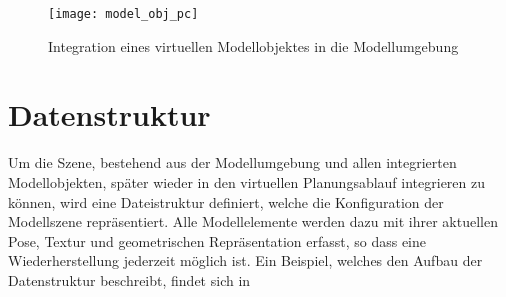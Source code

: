 \begin{figure}[ht]
	\begin{center}
	\texttt{[image: model\_obj\_pc]}
	\caption{Integration eines virtuellen Modellobjektes in die Modellumgebung}
	\label{fig.modobj}
	\end{center}
\end{figure}



\section{Datenstruktur}
Um die Szene, bestehend aus der Modellumgebung und allen integrierten Modellobjekten, später wieder in den virtuellen Planungsablauf integrieren zu können, wird eine Dateistruktur definiert, welche die Konfiguration der Modellszene repräsentiert. Alle Modellelemente werden dazu mit ihrer aktuellen Pose, Textur und geometrischen Repräsentation erfasst, so dass eine Wiederherstellung jederzeit möglich ist. Ein Beispiel, welches den Aufbau der Datenstruktur beschreibt, findet sich in \\